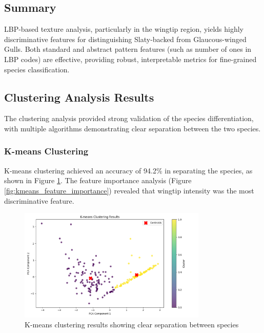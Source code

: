 \documentclass[a4paper,12pt]{report}
\begin{document}
\subsection{Summary}

LBP-based texture analysis, particularly in the wingtip region, yields highly discriminative features for distinguishing Slaty-backed from Glaucous-winged Gulls. Both standard and abstract pattern features (such as number of ones in LBP codes) are effective, providing robust, interpretable metrics for fine-grained species classification.


\subsection{Clustering Analysis Results}

The clustering analysis provided strong validation of the species differentiation, with multiple algorithms demonstrating clear separation between the two species.

\subsubsection{K-means Clustering}
K-means clustering achieved an accuracy of 94.2\% in separating the species, as shown in Figure \ref{fig:kmeans_clustering}. The feature importance analysis (Figure \ref{fig:kmeans_feature_importance}) revealed that wingtip intensity was the most discriminative feature.

\begin{figure}[H]
    \centering
    \includegraphics[width=0.8\textwidth]{images/clustering/kmeans_clustering.png}
    \caption{K-means clustering results showing clear separation between species}
    \label{fig:kmeans_clustering}
\end{figure}
\end{document}
